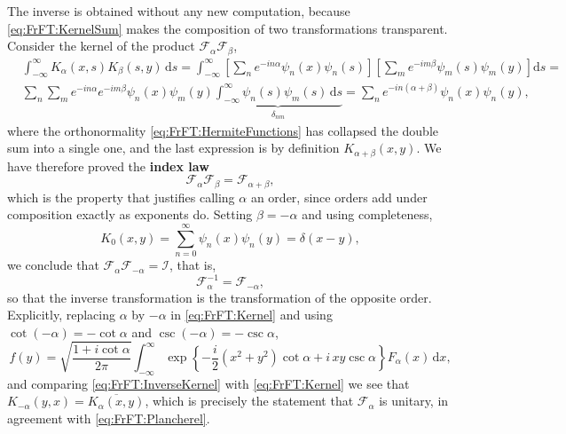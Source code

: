 			The inverse is obtained without any new computation, because \eqref{eq:FrFT:KernelSum} makes the composition of two transformations transparent. Consider the kernel of the product $\mathcal{F}_{\alpha}\mathcal{F}_{\beta}$,
			\begin{align*}
				& \int_{-\infty}^{\infty}K_{\alpha}(x,s)K_{\beta}(s,y)\,\mathrm{d}s = \int_{-\infty}^{\infty}\left[\sum_{n}e^{-in\alpha}\psi_{n}(x)\psi_{n}(s)\right]\left[\sum_{m}e^{-im\beta}\psi_{m}(s)\psi_{m}(y)\right]\mathrm{d}s = \\
				& \sum_{n}\sum_{m}e^{-in\alpha}e^{-im\beta}\psi_{n}(x)\psi_{m}(y)\underbrace{\int_{-\infty}^{\infty}\psi_{n}(s)\psi_{m}(s)\,\mathrm{d}s}_{\delta_{nm}} = \sum_{n}e^{-in\left(\alpha+\beta\right)}\psi_{n}(x)\psi_{n}(y),
			\end{align*}
			where the orthonormality \eqref{eq:FrFT:HermiteFunctions} has collapsed the double sum into a single one, and the last expression is by definition $K_{\alpha+\beta}(x,y)$. We have therefore proved the \textbf{index law}
			\begin{equation}\label{eq:FrFT:IndexLaw}
				\mathcal{F}_{\alpha}\mathcal{F}_{\beta} = \mathcal{F}_{\alpha+\beta},
			\end{equation}
			which is the property that justifies calling $\alpha$ an order, since orders add under composition exactly as exponents do. Setting $\beta = -\alpha$ and using completeness,
			\begin{equation}\label{eq:FrFT:Completeness}
				K_{0}(x,y) = \sum_{n=0}^{\infty}\psi_{n}(x)\psi_{n}(y) = \delta(x-y),
			\end{equation}
			we conclude that $\mathcal{F}_{\alpha}\mathcal{F}_{-\alpha} = \mathcal{I}$, that is,
			\begin{equation}\label{eq:FrFT:Inverse}
				\mathcal{F}_{\alpha}^{-1} = \mathcal{F}_{-\alpha},
			\end{equation}
			so that the inverse transformation is the transformation of the opposite order. Explicitly, replacing $\alpha$ by $-\alpha$ in \eqref{eq:FrFT:Kernel} and using $\cot(-\alpha) = -\cot\alpha$ and $\csc(-\alpha) = -\csc\alpha$,
			\begin{equation}\label{eq:FrFT:InverseKernel}
				f(y) = \sqrt{\frac{1+i\cot\alpha}{2\pi}}\int_{-\infty}^{\infty}\exp\left\{-\frac{i}{2}\left(x^{2}+y^{2}\right)\cot\alpha + i\,xy\csc\alpha\right\}F_{\alpha}(x)\,\mathrm{d}x,
			\end{equation}
			and comparing \eqref{eq:FrFT:InverseKernel} with \eqref{eq:FrFT:Kernel} we see that $K_{-\alpha}(y,x) = \overline{K_{\alpha}(x,y)}$, which is precisely the statement that $\mathcal{F}_{\alpha}$ is unitary, in agreement with \eqref{eq:FrFT:Plancherel}.

